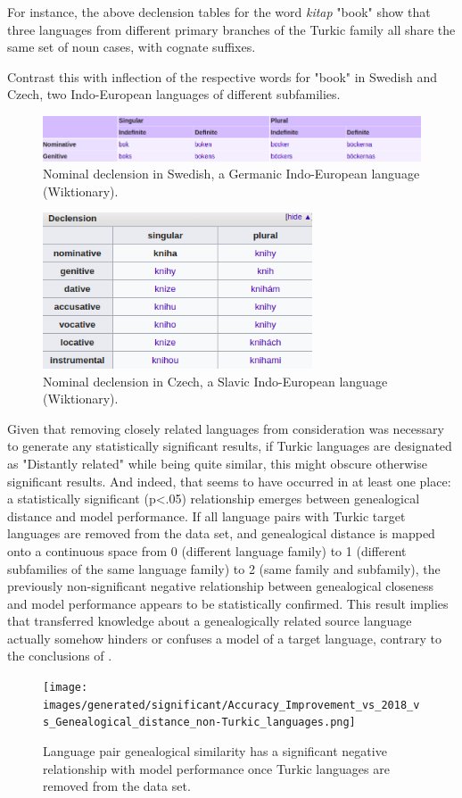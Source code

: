 For instance, the above declension tables for the word \textit{kitap} "book" show that three languages from different primary branches of the Turkic family all share the same set of noun cases, with cognate suffixes.

Contrast this with inflection of the respective words for "book" in Swedish and Czech, two Indo-European languages of different subfamilies.

\begin{figure}[p]
\includegraphics[width=14cm]{images/Swedish_bok.png}
\centering
\caption{Nominal declension in Swedish, a Germanic Indo-European language (Wiktionary).}
\end{figure}

\begin{figure}[p]
\includegraphics[width=8cm]{images/Czech_kniha.png}
\centering
\caption{Nominal declension in Czech, a Slavic Indo-European language (Wiktionary).}
\end{figure}

\newpage

Given that removing closely related languages from consideration was necessary to generate any statistically significant results, if Turkic languages are designated as "Distantly related" while being quite similar, this might obscure otherwise significant results. And indeed, that seems to have occurred in at least one place: a statistically significant (p<.05) relationship emerges between genealogical distance and model performance. If all language pairs with Turkic target languages are removed from the data set, and genealogical distance is mapped onto a continuous space from 0 (different language family) to 1 (different subfamilies of the same language family) to 2 (same family and subfamily), the previously non-significant negative relationship between genealogical closeness and model performance appears to be statistically confirmed. This result implies that transferred knowledge about a genealogically related source language actually somehow hinders or confuses a model of a target language, contrary to the conclusions of \cite{McCarthy2019}.

\begin{figure}[ht]
\texttt{[image: images/generated/significant/Accuracy\_Improvement\_vs\_2018\_vs\_Genealogical\_distance\_non-Turkic\_languages.png]}
\centering
\caption{Language pair genealogical similarity has a significant negative relationship with model performance once Turkic languages are removed from the data set.}
\end{figure}